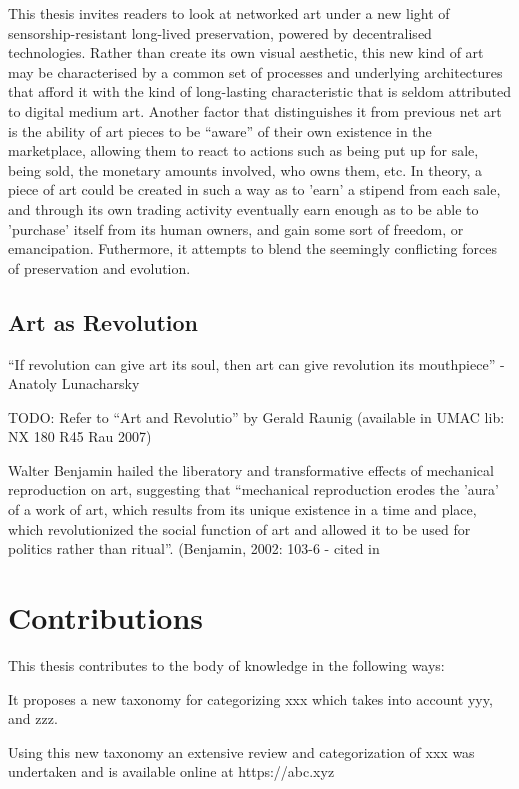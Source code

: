 This thesis invites readers to look at networked art under a new light of sensorship-resistant long-lived preservation, powered by decentralised technologies. Rather than create its own visual aesthetic, this new kind of art may be characterised by a common set of processes and underlying architectures that afford it with the kind of long-lasting characteristic that is seldom attributed to digital medium art.
Another factor that distinguishes it from previous net art is the ability of art pieces to be ``aware'' of their own existence in the marketplace, allowing them to react to actions such as being put up for sale, being sold, the monetary amounts involved, who owns them, etc.
In theory, a piece of art could be created in such a way as to 'earn' a stipend from each sale, and through its own trading activity eventually earn enough as to be able to 'purchase' itself from its human owners, and gain some sort of freedom, or emancipation.
Futhermore, it attempts to blend the seemingly conflicting forces of preservation and evolution.

\subsection{Art as Revolution}

``If revolution can give art its soul, then art can give revolution its mouthpiece'' - Anatoly Lunacharsky

TODO: Refer to ``Art and Revolutio'' by Gerald Raunig (available in UMAC lib: NX 180 R45 Rau 2007)

Walter Benjamin hailed the liberatory and transformative effects of mechanical reproduction on art, suggesting that ``mechanical reproduction erodes the 'aura' of a work of art, which results from its unique existence in a time and place, which revolutionized the social function of art and allowed it to be used for politics rather than ritual''. (Benjamin, 2002: 103-6 - cited in \cite[p.3]{gereArtTimeTechnology2006}

\section{Contributions}

This thesis contributes to the body of knowledge in the following ways:

It proposes a new taxonomy for categorizing xxx which takes into account yyy, and zzz.

Using this new taxonomy an extensive review and categorization of xxx was undertaken and is available online at https://abc.xyz

